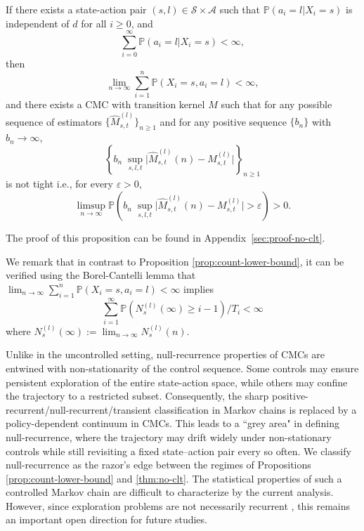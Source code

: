 \documentclass[twoside,11pt]{article}
\newcommand{\pow}[1]{^{(#1)}}%
\numberwithin{equation}{section}
\newcommand{\lp}{\left(}
\newcommand{\rp}{\right)}
\newcommand{\Ibb}{\mathbb{I}}
\newcommand{\Pbb}{\mathbb{P}}
\newcommand{\prob}{\Pbb}
\newcommand{\eps}{\varepsilon}
\renewcommand{\epsilon}{\eps}
\begin{document}
\begin{proposition}\label{thm:no-clt}
If there exists a state-action pair $(s,l)\in \mathcal S \times \mathcal A$ such that $\mathbb P(a_i=l|X_i=s)$ is independent of $d$ for all $i \geq 0$, and
\[
\sum_{i=0}^{\infty} \mathbb P(a_i=l|X_i=s) < \infty,
\]
then
    \[
    \lim_{n\to\infty} \sum_{i=1}^{n} \prob(X_i=s,a_i=l) < \infty,
    \]
and there exists a CMC with transition kernel $M$ such that for any possible sequence of estimators  
\(\{\hat M_{s,t}\pow l\}_{n\geq 1}\) and for any positive sequence \(\{b_n\}\) with \(b_n\rightarrow\infty\),
\begin{equation}\label{eq:tight}
    \left\{b_n\;
    \sup_{s,l,t}\bigl|
        \hat M_{s,t}\pow l(n) - M_{s,t}\pow l
    \bigr|\right\}_{n \geq 1}
\end{equation}
is not tight i.e., for every $\epsilon > 0$, 
\[
\limsup_{n \to \infty} \mathbb P \lp b_n\;
    \sup_{s,l,t}\bigl|
        \hat M_{s,t}\pow l(n) - M_{s,t}\pow l
    \bigr| > \epsilon \rp > 0.
\]
\end{proposition}
The proof of this proposition can be found in Appendix~\ref{sec:proof-no-clt}.

We remark that in contrast to Proposition \ref{prop:count-lower-bound}, it can be verified using the Borel-Cantelli lemma that $\lim_{n\to\infty} \sum_{i=1}^{n} \prob(X_i=s,a_i=l) < \infty$ implies \[\sum_{i=1}^{\infty} \prob\lp N_s \pow l(\infty) \geq i-1\rp/T_i < \infty\]
    where $N_s \pow l(\infty) := \lim_{n\to \infty} N_s \pow l(n)$.

Unlike in the uncontrolled setting, null-recurrence properties of CMCs are entwined with non-stationarity of the control sequence. 
Some controls may ensure persistent exploration of the entire state-action space, while others may confine the trajectory to a restricted subset. Consequently, the sharp positive-recurrent/null-recurrent/transient classification in Markov chains is replaced by a policy-dependent continuum in CMCs. 
This leads to a ``grey area" in defining null-recurrence, where the trajectory may drift widely under non-stationary controls while still revisiting a fixed state–action pair every so often.
We classify null-recurrence as the razor's edge between the regimes of Propositions \ref{prop:count-lower-bound} and \ref{thm:no-clt}. 
The statistical properties of such a controlled Markov chain are difficult to characterize by the current analysis. 
However, since exploration problems are not necessarily recurrent \citep{mutti_importance_2022}, this remains an important open direction for future studies.
\end{document}
